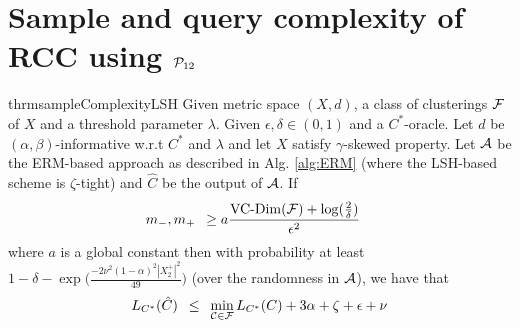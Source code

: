 \section{Sample and query complexity of RCC using $\mathcal P_{12}$}
\begin{restatable}{thrm}{sampleComplexityLSH}
Given metric space $(X, d)$, a class of clusterings $\mathcal F$ of $X$ and a threshold parameter $\lambda$. Given $\epsilon, \delta \in (0, 1)$ and a $C^*$-oracle. Let $d$ be $(\alpha, \beta)$-informative w.r.t $C^*$ and $\lambda$ and let $X$ satisfy $\gamma$-skewed property. Let $\mathcal A$ be the ERM-based approach as described in Alg. \ref{alg:ERM} (where the LSH-based scheme is $\zeta$-tight) and $\hat C$ be the output of $\mathcal A$. If  
\label{thm:sampleComplexityLSH}
\begin{align}
  &m_-, m_+ \enspace \ge a\frac{\operatorname{VC-Dim}({\mathcal F}) + \log(\frac{2}{\delta})}{\epsilon^2} 
\end{align}
where $a$ is a global constant then with probability at least $1-\delta - \exp\big(\frac{-2\nu^2(1-\alpha)^2|X_2^+|^2}{49}\big)$ (over the randomness in $\mathcal A$), we have that $$L_{C^*}(\hat C) \enspace\le\enspace \min_{\mathcal C \in \mathcal F} L_{C^*}(C) + 3\alpha + \zeta + \epsilon + \nu$$
\end{restatable}
